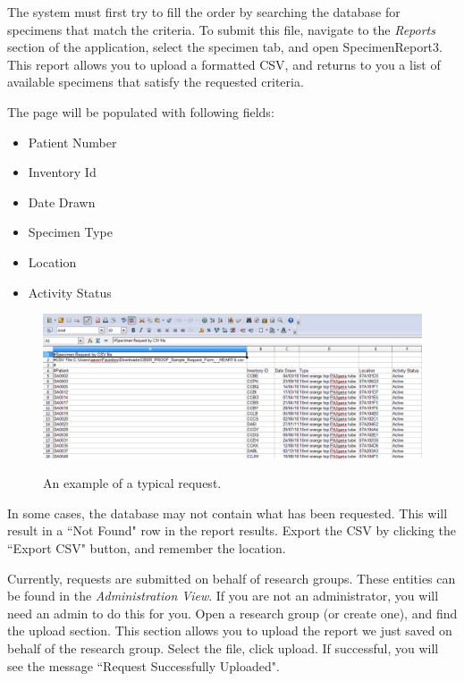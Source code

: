 The system must first try to fill the order by searching the database for specimens that match the criteria.  To submit this file, navigate to the \emph{Reports} section of the application, select the specimen tab, and open SpecimenReport3.  This report allows you to upload a formatted CSV, and returns to you a list of available specimens that satisfy the requested criteria.  
      
The page will be populated with following fields:
\begin{itemize}
\item Patient Number
\item Inventory Id
\item Date Drawn
\item Specimen Type
\item Location
\item Activity Status
\end{itemize}
    
\begin{figure}[H]
      \centering
      \scalebox{0.5}
      { \includegraphics*{screenshots/specimen_request/report_output.png} }
      \caption{An example of a typical request.}
      \label{Report Output}
\end{figure}
      
 In some cases, the database may not contain what has been requested.  This will result in a ``Not Found" row in the report results. Export the CSV by clicking the ``Export CSV" button, and remember the location. 

Currently, requests are submitted on behalf of research groups.  These entities can be found in the \emph{Administration View}.  If you are not an administrator, you will need an admin to do this for you.  Open a research group (or create one), and find the upload section.  This section allows you to upload the report we just saved on behalf of the research group.  Select the file, click upload.  If successful, you will see the message ``Request Successfully Uploaded".

